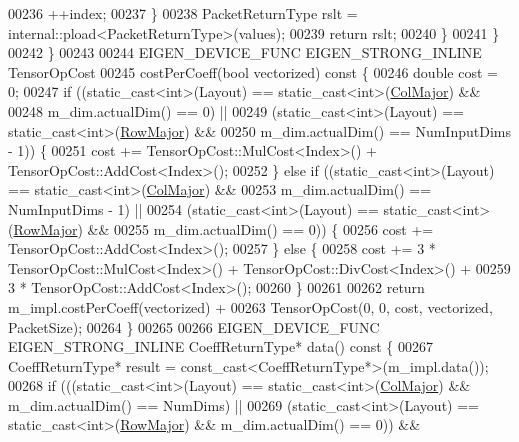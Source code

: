 \begin{DoxyCode}
00236           ++index;
00237         \}
00238         PacketReturnType rslt = internal::pload<PacketReturnType>(values);
00239         \textcolor{keywordflow}{return} rslt;
00240       \}
00241     \}
00242   \}
00243 
00244   EIGEN\_DEVICE\_FUNC EIGEN\_STRONG\_INLINE TensorOpCost
00245   costPerCoeff(\textcolor{keywordtype}{bool} vectorized)\textcolor{keyword}{ const }\{
00246     \textcolor{keywordtype}{double} cost = 0;
00247     \textcolor{keywordflow}{if} ((static\_cast<int>(Layout) == static\_cast<int>(\hyperlink{group__enums_ggaacded1a18ae58b0f554751f6cdf9eb13a0cbd4bdd0abcfc0224c5fcb5e4f6669a}{ColMajor}) &&
00248          m\_dim.actualDim() == 0) ||
00249         (static\_cast<int>(Layout) == \textcolor{keyword}{static\_cast<}\textcolor{keywordtype}{int}\textcolor{keyword}{>}(\hyperlink{group__enums_ggaacded1a18ae58b0f554751f6cdf9eb13acfcde9cd8677c5f7caf6bd603666aae3}{RowMajor}) &&
00250          m\_dim.actualDim() == NumInputDims - 1)) \{
00251       cost += TensorOpCost::MulCost<Index>() + TensorOpCost::AddCost<Index>();
00252     \} \textcolor{keywordflow}{else} \textcolor{keywordflow}{if} ((static\_cast<int>(Layout) == static\_cast<int>(\hyperlink{group__enums_ggaacded1a18ae58b0f554751f6cdf9eb13a0cbd4bdd0abcfc0224c5fcb5e4f6669a}{ColMajor}) &&
00253                 m\_dim.actualDim() == NumInputDims - 1) ||
00254                (static\_cast<int>(Layout) == \textcolor{keyword}{static\_cast<}\textcolor{keywordtype}{int}\textcolor{keyword}{>}(\hyperlink{group__enums_ggaacded1a18ae58b0f554751f6cdf9eb13acfcde9cd8677c5f7caf6bd603666aae3}{RowMajor}) &&
00255                 m\_dim.actualDim() == 0)) \{
00256       cost += TensorOpCost::AddCost<Index>();
00257     \} \textcolor{keywordflow}{else} \{
00258       cost += 3 * TensorOpCost::MulCost<Index>() + TensorOpCost::DivCost<Index>() +
00259               3 * TensorOpCost::AddCost<Index>();
00260     \}
00261 
00262     \textcolor{keywordflow}{return} m\_impl.costPerCoeff(vectorized) +
00263            TensorOpCost(0, 0, cost, vectorized, PacketSize);
00264   \}
00265 
00266   EIGEN\_DEVICE\_FUNC EIGEN\_STRONG\_INLINE CoeffReturnType* data()\textcolor{keyword}{ const }\{
00267     CoeffReturnType* result = \textcolor{keyword}{const\_cast<}CoeffReturnType*\textcolor{keyword}{>}(m\_impl.data());
00268     \textcolor{keywordflow}{if} (((static\_cast<int>(Layout) == static\_cast<int>(\hyperlink{group__enums_ggaacded1a18ae58b0f554751f6cdf9eb13a0cbd4bdd0abcfc0224c5fcb5e4f6669a}{ColMajor}) && m\_dim.actualDim() == NumDims) 
      ||
00269          (static\_cast<int>(Layout) == \textcolor{keyword}{static\_cast<}\textcolor{keywordtype}{int}\textcolor{keyword}{>}(\hyperlink{group__enums_ggaacded1a18ae58b0f554751f6cdf9eb13acfcde9cd8677c5f7caf6bd603666aae3}{RowMajor}) && m\_dim.actualDim() == 0)) &&

\end{DoxyCode}
